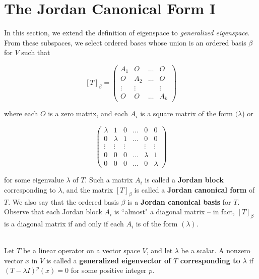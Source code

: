 \section{The Jordan Canonical Form I}

\begin{definition}
	In this section, we extend the definition of eigenspace to \textit{generalized eigenspace}. From these subspaces, we select ordered bases whose union is an ordered basis $\beta$ for $V$ such that

	\[[T]_\beta = \begin{pmatrix}
			A_1    & O      & \dots & O      \\
			O      & A_2    & \dots & O      \\
			\vdots & \vdots &       & \vdots \\
			O      & O      & \dots & A_k
		\end{pmatrix}\]

	where each $O$ is a zero matrix, and each $A_i$ is a square matrix of the form $(\lambda$) or

	\[\begin{pmatrix}
			\lambda & 1       & 0      & \dots & 0       & 0       \\
			0       & \lambda & 1      & \dots & 0       & 0       \\
			\vdots  & \vdots  & \vdots &       & \vdots  & \vdots  \\
			0       & 0       & 0      & \dots & \lambda & 1       \\
			0       & 0       & 0      & \dots & 0       & \lambda
		\end{pmatrix}\]

	for some eigenvalue $\lambda$ of $T$. Such a matrix $A_i$ is called a \textbf{Jordan block} corresponding to $\lambda$, and the matrix $[T]_\beta$ is called a \textbf{Jordan canonical form} of $T$. We also say that the ordered basis $\beta$ is a \textbf{Jordan canonical basis} for $T$. Observe that each Jordan block $A_i$ is ``almost" a diagonal matrix -- in fact, $[T]_\beta$ is a diagonal matrix if and only if each $A_i$ is of the form $(\lambda)$.
\end{definition}

\begin{definition}
	\hfill\\
	Let $T$ be a linear operator on a vector space $V$, and let $\lambda$ be a scalar. A nonzero vector $x$ in $V$ is called a \textbf{generalized eigenvector of $T$ corresponding to $\lambda$} if $(T -\lambda I)^p(x) = 0$ for some positive integer $p$.
\end{definition}

